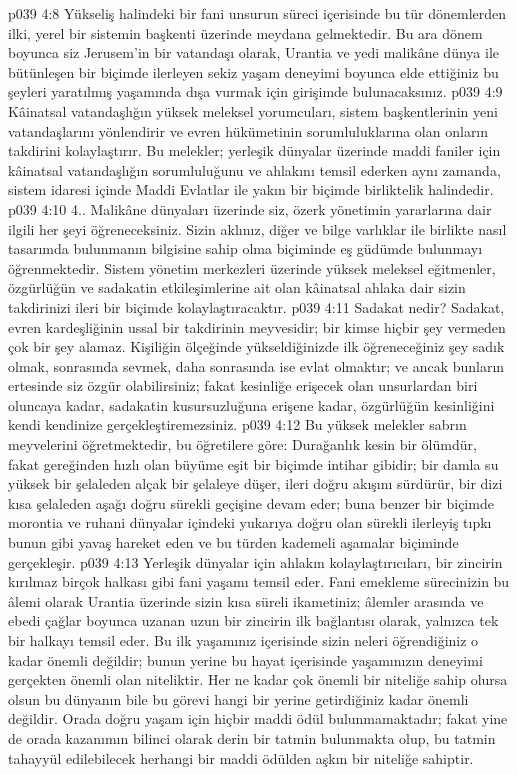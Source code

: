 \vs p039 4:8 Yükseliş halindeki bir fani unsurun süreci içerisinde bu tür dönemlerden ilki, yerel bir sistemin başkenti üzerinde meydana gelmektedir. Bu ara dönem boyunca siz Jerusem’in bir vatandaşı olarak, Urantia ve yedi malikâne dünya ile bütünleşen bir biçimde ilerleyen sekiz yaşam deneyimi boyunca elde ettiğiniz bu şeyleri yaratılmış yaşamında dışa vurmak için girişimde bulunacaksınız.
\vs p039 4:9 Kâinatsal vatandaşlığın yüksek meleksel yorumcuları, sistem başkentlerinin yeni vatandaşlarını yönlendirir ve evren hükümetinin sorumluluklarına olan onların takdirini kolaylaştırır. Bu melekler; yerleşik dünyalar üzerinde maddi faniler için kâinatsal vatandaşlığın sorumluluğunu ve ahlakını temsil ederken aynı zamanda, sistem idaresi içinde Maddi Evlatlar ile yakın bir biçimde birliktelik halindedir.
\vs p039 4:10 4.\bibnobreakspace {}. Malikâne dünyaları üzerinde siz, özerk yönetimin yararlarına dair ilgili her şeyi öğreneceksiniz. Sizin aklınız, diğer ve bilge varlıklar ile birlikte nasıl tasarımda bulunmanın bilgisine sahip olma biçiminde eş güdümde bulunmayı öğrenmektedir. Sistem yönetim merkezleri üzerinde yüksek meleksel eğitmenler, özgürlüğün ve sadakatin etkileşimlerine ait olan kâinatsal ahlaka dair sizin takdirinizi ileri bir biçimde kolaylaştıracaktır.
\vs p039 4:11 Sadakat nedir? Sadakat, evren kardeşliğinin ussal bir takdirinin meyvesidir; bir kimse hiçbir şey vermeden çok bir şey alamaz. Kişiliğin ölçeğinde yükseldiğinizde ilk öğreneceğiniz şey sadık olmak, sonrasında sevmek, daha sonrasında ise evlat olmaktır; ve ancak bunların ertesinde siz özgür olabilirsiniz; fakat kesinliğe erişecek olan unsurlardan biri oluncaya kadar, sadakatin kusursuzluğuna erişene kadar, özgürlüğün kesinliğini kendi kendinize gerçekleştiremezsiniz.
\vs p039 4:12 Bu yüksek melekler sabrın meyvelerini öğretmektedir, bu öğretilere göre: Durağanlık kesin bir ölümdür, fakat gereğinden hızlı olan büyüme eşit bir biçimde intihar gibidir; bir damla su yüksek bir şelaleden alçak bir şelaleye düşer, ileri doğru akışını sürdürür, bir dizi kısa şelaleden aşağı doğru sürekli geçişine devam eder; buna benzer bir biçimde morontia ve ruhani dünyalar içindeki yukarıya doğru olan sürekli ilerleyiş tıpkı bunun gibi yavaş hareket eden ve bu türden kademeli aşamalar biçiminde gerçekleşir.
\vs p039 4:13 Yerleşik dünyalar için ahlakın kolaylaştırıcıları, bir zincirin kırılmaz birçok halkası gibi fani yaşamı temsil eder. Fani emekleme sürecinizin bu âlemi olarak Urantia üzerinde sizin kısa süreli ikametiniz; âlemler arasında ve ebedi çağlar boyunca uzanan uzun bir zincirin ilk bağlantısı olarak, yalnızca tek bir halkayı temsil eder. Bu ilk yaşamınız içerisinde sizin neleri öğrendiğiniz o kadar önemli değildir; bunun yerine bu hayat içerisinde yaşamınızın deneyimi gerçekten önemli olan niteliktir. Her ne kadar çok önemli bir niteliğe sahip olursa olsun bu dünyanın  bile bu görevi hangi bir  yerine getirdiğiniz kadar önemli değildir. Orada doğru yaşam için hiçbir maddi ödül bulunmamaktadır; fakat yine de orada kazanımın bilinci olarak derin bir tatmin bulunmakta olup, bu tatmin tahayyül edilebilecek herhangi bir maddi ödülden aşkın bir niteliğe sahiptir.
